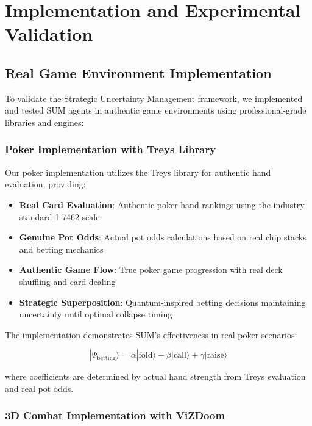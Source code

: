 \documentclass[11pt,a4paper]{article}
\begin{document}
\section{Implementation and Experimental Validation}

\subsection{Real Game Environment Implementation}

To validate the Strategic Uncertainty Management framework, we implemented and tested SUM agents in authentic game environments using professional-grade libraries and engines:

\subsubsection{Poker Implementation with Treys Library}

Our poker implementation utilizes the Treys library \citep{treys2024} for authentic hand evaluation, providing:

\begin{itemize}
\item \textbf{Real Card Evaluation}: Authentic poker hand rankings using the industry-standard 1-7462 scale
\item \textbf{Genuine Pot Odds}: Actual pot odds calculations based on real chip stacks and betting mechanics
\item \textbf{Authentic Game Flow}: True poker game progression with real deck shuffling and card dealing
\item \textbf{Strategic Superposition}: Quantum-inspired betting decisions maintaining uncertainty until optimal collapse timing
\end{itemize}

The implementation demonstrates SUM's effectiveness in real poker scenarios:

\begin{equation}
|\Psi_{\text{betting}}\rangle = \alpha|\text{fold}\rangle + \beta|\text{call}\rangle + \gamma|\text{raise}\rangle
\end{equation}

where coefficients are determined by actual hand strength from Treys evaluation and real pot odds.

\subsubsection{3D Combat Implementation with ViZDoom}
\end{document}
